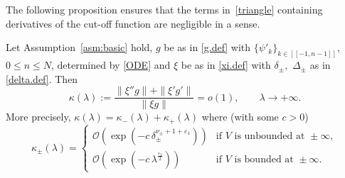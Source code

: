 The following proposition ensures that the terms in~\eqref{triangle}
containing derivatives of the cut-off function are negligible in a sense.
\begin{Proposition}\label{prop:cut}
Let Assumption~\ref{asm:basic} hold, $g$ be as in \eqref{g.def} with $\{\psi'_k\}_{k\in[[-1,n-1]]}$, $0 \leq n \leq N$, determined by \eqref{ODE} and $\xi$ be as in \eqref{xi.def} with $\delta_\pm,$ $\Delta_\pm$ as in \eqref{delta.def}. 
Then
\begin{equation}\label{cut.rates}
\kappa(\lambda) :=
\frac{\|\xi'' g\| + \|\xi' g'\|}{\|\xi g\|} 
= o(1), 
\qquad \lambda \to + \infty.
\end{equation}
More precisely, $\kappa(\lambda) = \kappa_-(\lambda) + \kappa_+(\lambda)$ where (with some $c>0$) 
\begin{equation}\label{kappa.est}
\kappa_\pm(\lambda) = 
\begin{cases}
	{\mathcal{O}}\left(\exp(-c \, \delta_\pm^{\nu_\pm + 1+{\varepsilon}_1}) \right) & \text{if } V \text{ is unbounded at } \pm \infty,
	\\[2mm]
	{\mathcal{O}}\left(\exp \left(-c \, \lambda^{\frac{{\varepsilon}_2}{2}} \right) \right)& \text{if } V \text{ is bounded at } \pm \infty. 
\end{cases}
\end{equation}

\end{Proposition}
